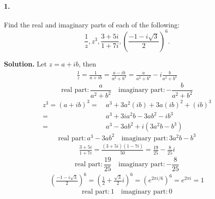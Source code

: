 \documentclass[12pt, a4paper, oneside]{article}
\newenvironment{solution}{\par\noindent\textbf{Solution. }}{\bigskip\par}
\begin{document}
\paragraph{1.} Find the real and imaginary parts of each of the following:
\begin{equation*}
    \frac{1}{z},z^3,\frac{3+5i}{1+7i},\left(\frac{-1-i\sqrt{3}}{2}\right)^6.
\end{equation*}
\begin{solution} Let $ z = a + ib$, then
    \begin{equation}
        \begin{aligned}
            \frac{1}{z} = \frac{1}{a+ib} = \frac{a-ib}{a^2+b^2} = \frac{a}{a^2+b^2}-i\frac{b}{a^2+b^2}
        \end{aligned}
    \end{equation}
    \begin{equation*}
        \text{real part}: \frac{a}{a^2+b^2}\quad \text{imaginary part}: -\frac{b}{a^2+b^2}
    \end{equation*}
    \begin{equation}
        \begin{aligned}
            z^3 = (a+ib)^3 =&\ a^3+3a^2(ib)+3a(ib)^2+(ib)^3\\
            =&\ a^3+3ia^2b-3ab^2-ib^3\\
            =&\ a^3-3ab^2+i(3a^2b-b^3)
        \end{aligned}
    \end{equation}
    \begin{equation*}
        \text{real part}: a^3-3ab^2 \quad \text{imaginary part}: 3a^2b-b^3
    \end{equation*}
    \begin{equation}
        \begin{aligned}
            \frac{3+5i}{1+7i} = \frac{(3+5i)(1-7i)}{50} = \frac{19}{25}-\frac{8}{25}i
        \end{aligned}
    \end{equation}
    \begin{equation*}
        \text{real part}: \frac{19}{25} \quad \text{imaginary part}: -\frac{8}{25}
    \end{equation*}
    \begin{equation}
        \begin{aligned}
            \left(\frac{-1-i\sqrt{3}}{2}\right)^6 = \left(\frac{1}{2}+\frac{\sqrt{3}}{2}i\right)^6=\left(e^{2\pi i/6}\right)^6=e^{2\pi i} = 1
        \end{aligned}
    \end{equation}
    \begin{equation*}
        \text{real part}: 1\quad \text{imaginary part}: 0
    \end{equation*}
\end{solution}
\end{document}

